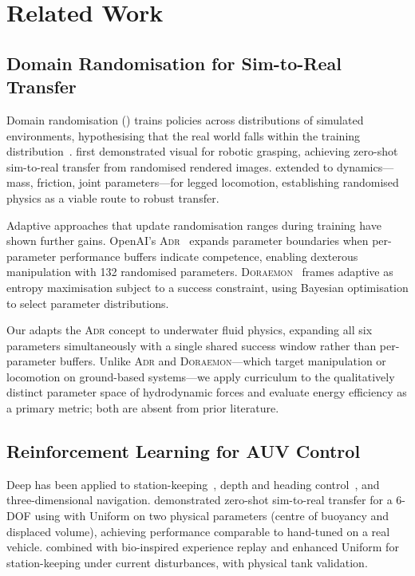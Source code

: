 
\section{Related Work}
\label{sec:related}

\subsection{Domain Randomisation for Sim-to-Real Transfer}

Domain randomisation (\DR{}) trains policies across distributions of
simulated environments, hypothesising that the real world falls within
the training distribution~\cite{tobin2017}.
\citet{tobin2017} first demonstrated visual \DR{} for robotic
grasping, achieving zero-shot sim-to-real transfer from randomised
rendered images.
\citet{peng2018} extended \DR{} to dynamics---mass, friction, joint
parameters---for legged locomotion, establishing randomised physics as a
viable route to robust transfer.

Adaptive approaches that update randomisation ranges during training
have shown further gains.
OpenAI's \textsc{Adr}~\cite{akkaya2019} expands parameter boundaries
when per-parameter performance buffers indicate competence, enabling
dexterous manipulation with 132 randomised parameters.
\textsc{Doraemon}~\cite{tiboni2024} frames adaptive \DR{} as entropy
maximisation subject to a success constraint, using Bayesian
optimisation to select parameter distributions.

Our \CDR{} adapts the \textsc{Adr} concept to underwater fluid physics,
expanding all six parameters simultaneously with a single shared
success window rather than per-parameter buffers.
Unlike \textsc{Adr} and \textsc{Doraemon}---which target manipulation or
locomotion on ground-based systems---we apply curriculum \DR{} to the
qualitatively distinct parameter space of hydrodynamic forces and
evaluate energy efficiency as a primary metric; both are absent from
prior \DR{} literature.

\subsection{Reinforcement Learning for AUV Control}

Deep \RL{} has been applied to \AUV{} station-keeping~\cite{carlucho2018},
depth and heading control~\cite{shi2020}, and three-dimensional
navigation.
\citet{arndt2024} demonstrated zero-shot sim-to-real transfer for a
6-DOF \AUV{} using \SAC{} with Uniform \DR{} on two physical parameters
(centre of buoyancy and displaced volume), achieving performance
comparable to hand-tuned \PID{} on a real vehicle.
\citet{chaffre2025} combined \SAC{} with bio-inspired experience replay
and enhanced Uniform \DR{} for \AUV{} station-keeping under current
disturbances, with physical tank validation.

